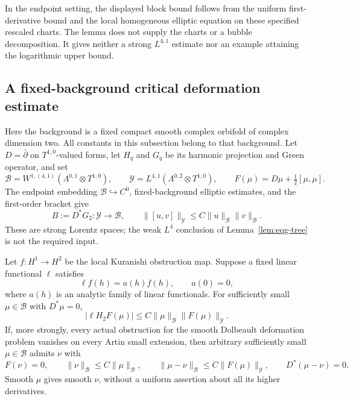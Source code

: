 In the endpoint setting, the displayed block bound follows from the
uniform first-derivative bound and the local homogeneous elliptic
equation on these specified rescaled charts.  The lemma does not
supply the charts or a bubble decomposition.  It gives neither a
strong $L^{4,1}$ estimate nor an example attaining the logarithmic
upper bound.

\subsection{A fixed-background critical deformation estimate}

Here the background is a fixed compact smooth complex orbifold of
complex dimension two.  All constants in this subsection belong to
that background.  Let $D=\bar\partial$ on $T^{1,0}$-valued forms,
let $H_q$ and $G_q$ be its harmonic projection and Green operator,
and set
\[
 \mathcal B=W^{1,(4,1)}(\Lambda^{0,1}\otimes T^{1,0}),\qquad
 \mathcal Y=L^{4,1}(\Lambda^{0,2}\otimes T^{1,0}),
 \qquad F(\mu)=D\mu+\tfrac12[\mu,\mu].
\]
The endpoint embedding $\mathcal B\hookrightarrow C^0$, fixed-background
elliptic estimates, and the first-order bracket give
\[
 B:=D^*G_2:\mathcal Y\longrightarrow\mathcal B,
 \qquad
 \|[u,v]\|_{\mathcal Y}\leq C\|u\|_{\mathcal B}\|v\|_{\mathcal B}.
\]
These are strong Lorentz spaces; the weak $L^4$ conclusion of
Lemma~\ref{lem:eqg-tree} is not the required input.

\begin{proposition}
\label{prop:eqg-kuranishi}
Let $f:H^1\to H^2$ be the local Kuranishi obstruction map.
Suppose a fixed linear functional $\ell$ satisfies
\[
 \ell f(h)=a(h)f(h),\qquad a(0)=0,
\]
where $a(h)$ is an analytic family of linear functionals.
For sufficiently small $\mu\in\mathcal B$ with $D^*\mu=0$,
\begin{equation}\label{eq:eqg-kuranishi-projection}
 |\ell H_2F(\mu)|\leq C\|\mu\|_{\mathcal B}\|F(\mu)\|_{\mathcal Y}.
\end{equation}
If, more strongly, every actual obstruction for the smooth Dolbeault
deformation problem vanishes on every Artin small extension, then
arbitrary sufficiently small $\mu\in\mathcal B$ admits $\nu$ with
\begin{equation}\label{eq:eqg-kuranishi-retraction}
 F(\nu)=0,\qquad
 \|\nu\|_{\mathcal B}\leq C\|\mu\|_{\mathcal B},\qquad
 \|\mu-\nu\|_{\mathcal B}\leq C\|F(\mu)\|_{\mathcal Y},
 \qquad D^*(\mu-\nu)=0.
\end{equation}
Smooth $\mu$ gives smooth $\nu$, without a uniform assertion about
all its higher derivatives.
\end{proposition}

